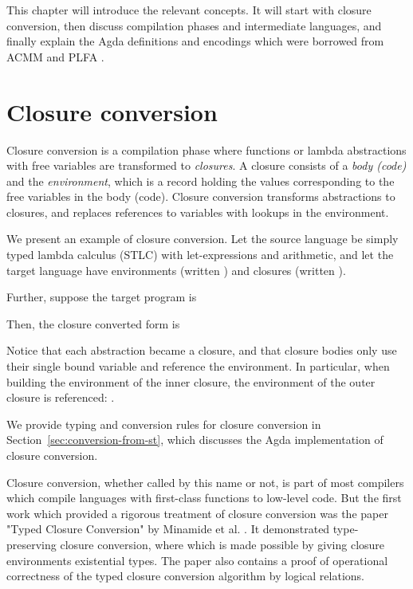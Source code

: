 \documentclass[bsc,frontabs,oneside,singlespacing,parskip,deptreport]{infthesis}
\theoremstyle{definition}
\theoremstyle{lemma}
\begin{document}
This chapter will introduce the relevant concepts. It will start with
closure conversion, then discuss compilation phases and intermediate
languages, and finally explain the Agda definitions and encodings
which were borrowed from ACMM \cite{DBLP:journals/pacmpl/AllaisA0MM18}
and PLFA \cite{DBLP:conf/sbmf/Wadler18}.

\section{Closure conversion}
\label{sec:closure-conversion}

Closure conversion is a compilation phase where functions or lambda
abstractions with free variables are transformed to
\textit{closures}. A closure consists of a \textit{body (code)} and
the \textit{environment}, which is a record holding the values
corresponding to the free variables in the body (code). Closure
conversion transforms abstractions to closures, and replaces
references to variables with lookups in the environment.

We present an example of closure conversion. Let the source language
be simply typed lambda calculus (STLC) with let-expressions and
arithmetic, and let the target language have environments (written
) and closures (written ).

Further, suppose the target program is


Then, the closure converted form is


Notice that each abstraction became a closure, and that closure bodies
only use their single bound variable and reference the environment. In
particular, when building the environment of the inner closure, the
environment of the outer closure is referenced: .

We provide typing and conversion rules for closure conversion in
Section~\ref{sec:conversion-from-st}, which discusses the Agda
implementation of closure conversion.

Closure conversion, whether called by this name or not, is part of
most compilers which compile languages with first-class functions to
low-level code. But the first work which provided a rigorous treatment
of closure conversion was the paper "Typed Closure Conversion" by
Minamide et al. \cite{TODO}. It demonstrated type-preserving closure
conversion, where which is made possible by giving closure
environments existential types. The paper also contains a proof of
operational correctness of the typed closure conversion algorithm by
logical relations.
\end{document}
